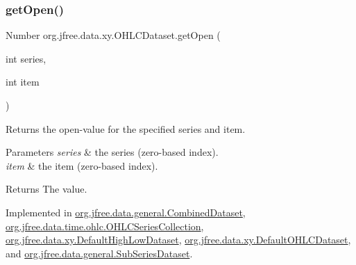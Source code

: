 \subsubsection{\texorpdfstring{get\+Open()}{getOpen()}}
{\footnotesize\ttfamily Number org.\+jfree.\+data.\+xy.\+O\+H\+L\+C\+Dataset.\+get\+Open (\begin{DoxyParamCaption}\item[{int}]{series,  }\item[{int}]{item }\end{DoxyParamCaption})}

Returns the open-\/value for the specified series and item.


\begin{DoxyParams}{Parameters}
{\em series} & the series (zero-\/based index). \\
\hline
{\em item} & the item (zero-\/based index).\\
\hline
\end{DoxyParams}
\begin{DoxyReturn}{Returns}
The value. 
\end{DoxyReturn}


Implemented in \mbox{\hyperlink{classorg_1_1jfree_1_1data_1_1general_1_1_combined_dataset_a9113b1e7b51c716176aa3f8e954d0e7a}{org.\+jfree.\+data.\+general.\+Combined\+Dataset}}, \mbox{\hyperlink{classorg_1_1jfree_1_1data_1_1time_1_1ohlc_1_1_o_h_l_c_series_collection_aab9642612da56d8b23037a2e0ab64f64}{org.\+jfree.\+data.\+time.\+ohlc.\+O\+H\+L\+C\+Series\+Collection}}, \mbox{\hyperlink{classorg_1_1jfree_1_1data_1_1xy_1_1_default_high_low_dataset_a8fd97df563c199b6ace3bb56ac18b0a1}{org.\+jfree.\+data.\+xy.\+Default\+High\+Low\+Dataset}}, \mbox{\hyperlink{classorg_1_1jfree_1_1data_1_1xy_1_1_default_o_h_l_c_dataset_a851641b43354b55dcd343a57b5f1b4a9}{org.\+jfree.\+data.\+xy.\+Default\+O\+H\+L\+C\+Dataset}}, and \mbox{\hyperlink{classorg_1_1jfree_1_1data_1_1general_1_1_sub_series_dataset_aaa997e001d9ecd85cb2ecb628048e3ab}{org.\+jfree.\+data.\+general.\+Sub\+Series\+Dataset}}.

\mbox{\label{interfaceorg_1_1jfree_1_1data_1_1xy_1_1_o_h_l_c_dataset_a20654fd4801bc8871dfe51bf65d62af6}} 
